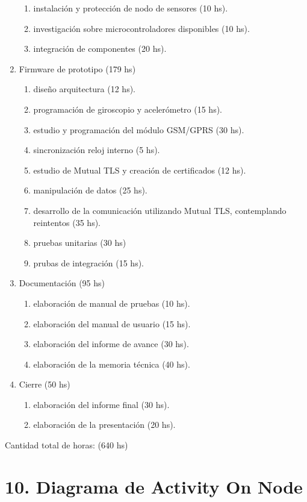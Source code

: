 \documentclass[
11pt, %
codirector, %
]{charter}
\begin{document}
\begin{enumerate}
\begin{enumerate}
		\item instalación y protección de nodo de sensores (10 hs).
		\item investigación sobre microcontroladores disponibles (10 hs).
		\item integración de componentes (20 hs).
	\end{enumerate}
\item Firmware de prototipo (179 hs)
	\begin{enumerate}
		\item diseño arquitectura (12 hs).
		\item programación de giroscopio y acelerómetro (15 hs).		
		\item estudio y programación del módulo GSM/GPRS (30 hs).
		\item sincronización reloj interno (5 hs).
		\item estudio de Mutual TLS y creación de certificados (12 hs).
		\item manipulación de datos (25 hs).
		\item desarrollo de la comunicación utilizando Mutual TLS, contemplando reintentos (35 hs).
		\item pruebas unitarias (30 hs)
		\item prubas de integración (15 hs).
	\end{enumerate}
\item Documentación (95 hs)
	\begin{enumerate}
		\item elaboración de manual de pruebas (10 hs).
		\item elaboración del manual de usuario (15 hs).
		\item elaboración del informe de avance (30 hs).		
		\item elaboración de la memoria técnica (40 hs).
	\end{enumerate}
\item Cierre (50 hs)
	\begin{enumerate}
		\item elaboración del informe final (30 hs).	
		\item elaboración de la presentación (20 hs).
	\end{enumerate}
\end{enumerate}

Cantidad total de horas: (640 hs)

\section{10. Diagrama de Activity On Node}
\label{sec:AoN}
\end{document}

